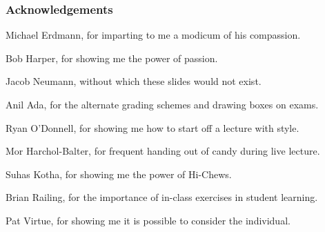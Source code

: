 \documentclass[aspectratio=169, handout]{beamer}
\begin{document}
\begin{frame}[fragile]
  \frametitle{Acknowledgements}

  \begin{center}
    Michael Erdmann, for imparting to me a modicum of his compassion.

    \pause
    \vspace{\fill}

    Bob Harper, for showing me the power of passion.

    \pause
    \vspace{\fill}

    Jacob Neumann, without which these slides would not exist.

    \pause
    \vspace{\fill}

    Anil Ada, for the alternate grading schemes and drawing boxes on exams.

    \pause
    \vspace{\fill}

    Ryan O'Donnell, for showing me how to start off a lecture with style.

    \pause
    \vspace{\fill}

    Mor Harchol-Balter, for frequent handing out of candy during live lecture.

    \pause
    \vspace{\fill}

    Suhas Kotha, for showing me the power of Hi-Chews.

    \pause
    \vspace{\fill}

    Brian Railing, for the importance of in-class exercises in student learning.

    \pause
    \vspace{\fill}

    Pat Virtue, for showing me it is possible to consider the individual.

  \end{center}
\end{frame}
\end{document}
